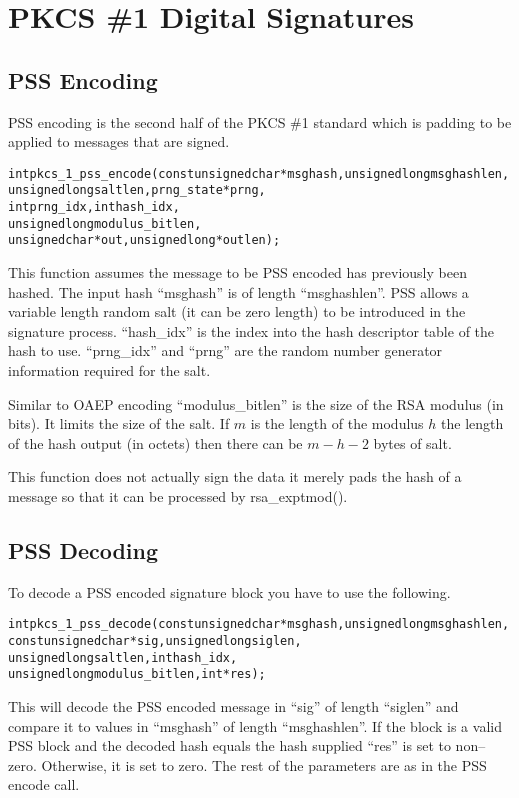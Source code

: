 \documentclass[a4paper]{book}
\begin{document}
\section{PKCS \#1 Digital Signatures}

\subsection{PSS Encoding}
PSS encoding is the second half of the PKCS \#1 standard which is padding to be applied to messages that are signed.  

\begin{alltt}
int pkcs_1_pss_encode(const unsigned char *msghash, unsigned long msghashlen,
                            unsigned long saltlen,  prng_state   *prng,     
                            int           prng_idx, int           hash_idx,
                            unsigned long modulus_bitlen,
                            unsigned char *out,     unsigned long *outlen);
\end{alltt}

This function assumes the message to be PSS encoded has previously been hashed.  The input hash ``msghash'' is of length 
``msghashlen''.  PSS allows a variable length random salt (it can be zero length) to be introduced in the signature process.  
``hash\_idx'' is the index into the hash descriptor table of the hash to use.  ``prng\_idx'' and ``prng'' are the random
number generator information required for the salt.

Similar to OAEP encoding ``modulus\_bitlen'' is the size of the RSA modulus (in bits).  It limits the size of the salt.  If $m$ is the length
of the modulus $h$ the length of the hash output (in octets) then there can be $m - h - 2$ bytes of salt.  

This function does not actually sign the data it merely pads the hash of a message so that it can be processed by rsa\_exptmod().

\subsection{PSS Decoding}

To decode a PSS encoded signature block you have to use the following.

\begin{alltt}
int pkcs_1_pss_decode(const unsigned char *msghash, unsigned long msghashlen,
                      const unsigned char *sig,     unsigned long siglen,
                            unsigned long saltlen,  int           hash_idx,
                            unsigned long modulus_bitlen, int    *res);
\end{alltt}
This will decode the PSS encoded message in ``sig'' of length ``siglen'' and compare it to values in ``msghash'' of length
``msghashlen''.  If the block is a valid PSS block and the decoded hash equals the hash supplied ``res'' is set to non--zero.  Otherwise, 
it is set to zero.  The rest of the parameters are as in the PSS encode call.
\end{document}
